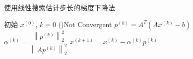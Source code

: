 \begin{algorithm}[htbp]
    \caption{使用线性搜索估计步长的梯度下降法}
    初始 $ x^{(0)} $, $k=0$\;
    \While(){Not Convergent}{
        $p^{(k)}=A^{T}\left(A x^{(k)}-b\right)$\;
        $\alpha^{(k)}=\dfrac{\left\|p^{(k)}\right\|_{2}^{2}}{\left\|A p^{(k)}\right\|_{2}^{2}}$\;
        $x^{(k+1)}=x^{(k)}-\alpha^{(k)} p^{(k)}$\;
    }
\end{algorithm}
